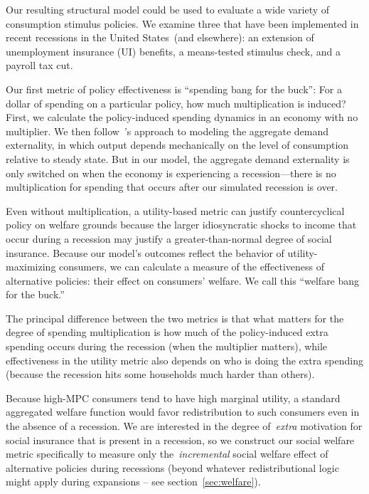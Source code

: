 \documentclass[qe]{econsocart}
\begin{document}
Our resulting structural model could be used to evaluate a wide variety of consumption stimulus policies.  We examine three that have been implemented in recent recessions in the United States\ (and elsewhere): an extension of unemployment insurance (UI) benefits, a means-tested stimulus check, and a payroll tax cut.

Our first metric of policy effectiveness is ``spending bang for the buck'': For a dollar of spending on a particular policy, how much multiplication is induced?  %
First, we calculate the policy-induced spending dynamics in an economy with no multiplier.  We then follow~\cite{kmpHandbook}'s approach to modeling the aggregate demand externality, in which output depends mechanically on the level of consumption relative to steady state. But in our model, the aggregate demand externality is only switched on when the economy is experiencing a recession---there is no multiplication for spending that occurs after our simulated recession is over.  %

Even without multiplication, a utility-based metric can justify countercyclical policy on welfare grounds because the larger idiosyncratic shocks to income that occur during a recession may justify a greater-than-normal degree of social insurance.  Because our model's outcomes reflect the behavior of utility-maximizing consumers, we can calculate a measure of the effectiveness of alternative policies:  their effect on consumers' welfare.  We call this ``welfare bang for the buck.''

The principal difference between the two metrics is that what matters for the degree of spending multiplication is how much of the policy-induced extra spending occurs during the recession (when the multiplier matters), while effectiveness in the utility metric also depends on who is doing the extra spending (because the recession hits some households much harder than others).

Because high-MPC consumers tend to have high marginal utility, a standard aggregated welfare function would favor redistribution to such consumers even in the absence of a recession. We are interested in the degree of~\textit{extra} motivation for social insurance that is present in a recession, so we construct our social welfare metric specifically to measure only the~\textit{incremental} social welfare effect of alternative policies during recessions (beyond whatever redistributional logic might apply during expansions -- see section~\ref{sec:welfare}).
\end{document}
